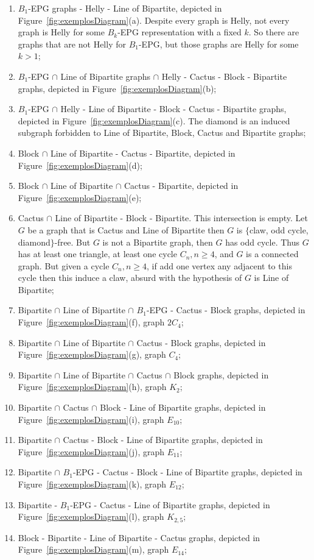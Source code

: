 \documentclass[9pt]{entcs}
\begin{document}
\begin{enumerate}[label=(\arabic*)]
    \item $B_1$-EPG graphs - Helly - Line of Bipartite, depicted in Figure~\ref{fig:exemplosDiagram}(a). Despite every graph is Helly, not every graph is Helly for some $B_k$-EPG representation with a fixed $k$. So there are graphs that are not Helly for $B_1$-EPG, but those graphs are Helly for some $k>1$;%
    
    \item $B_1$-EPG $\cap$ Line of Bipartite graphs $\cap$ Helly - Cactus - Block - Bipartite graphs, depicted in Figure~\ref{fig:exemplosDiagram}(b);%
    \item $B_1$-EPG $\cap$ Helly - Line of Bipartite - Block - Cactus - Bipartite graphs, depicted in Figure~\ref{fig:exemplosDiagram}(c). The diamond is an induced subgraph forbidden to Line of Bipartite, Block, Cactus and Bipartite graphs;%
    \item Block $\cap$ Line of Bipartite - Cactus - Bipartite, depicted in Figure~\ref{fig:exemplosDiagram}(d);%
    \item Block $\cap$ Line of Bipartite $\cap$  Cactus - Bipartite, depicted in Figure~\ref{fig:exemplosDiagram}(e);%
    \item Cactus $\cap$ Line of Bipartite - Block - Bipartite. This intersection is empty. Let $G$ be a graph that is Cactus and Line of Bipartite then $G$ is $\{$claw, odd cycle, diamond$\}$-free. But $G$ is not a Bipartite graph, then $G$ has odd cycle. Thus $G$ has at least one triangle, at least one cycle $C_n, n\geq 4$, and $G$ is a connected graph. But given a cycle $C_n, n\geq 4$, if add one vertex any adjacent to this cycle then this induce a claw, absurd with the hypothesis of $G$ is Line of Bipartite;%
    \item Bipartite $\cap$ Line of Bipartite $\cap$ $B_1$-EPG - Cactus - Block graphs, depicted in Figure~\ref{fig:exemplosDiagram}(f), graph $2C_4$;%
    \item Bipartite $\cap$ Line of Bipartite $\cap$  Cactus - Block graphs, depicted in Figure~\ref{fig:exemplosDiagram}(g), graph $C_4$;%
    \item Bipartite $\cap$ Line of Bipartite $\cap$  Cactus $\cap$ Block graphs, depicted in Figure~\ref{fig:exemplosDiagram}(h), graph $K_2$;%
  \item Bipartite $\cap$  Cactus $\cap$ Block - Line of Bipartite graphs, depicted in Figure~\ref{fig:exemplosDiagram}(i), graph $E_{10}$;%
    \item Bipartite  $\cap$  Cactus - Block -  Line of Bipartite graphs, depicted in Figure~\ref{fig:exemplosDiagram}(j), graph $E_{11}$;%
     \item Bipartite $\cap$ $B_1$-EPG - Cactus - Block -  Line of Bipartite graphs, depicted in Figure~\ref{fig:exemplosDiagram}(k), graph $E_{12}$;%
      \item Bipartite - $B_1$-EPG - Cactus -  Line of Bipartite graphs, depicted in Figure~\ref{fig:exemplosDiagram}(l), graph $K_{2,5}$;%
      \item Block - Bipartite - Line of Bipartite  - Cactus graphs, depicted in Figure~\ref{fig:exemplosDiagram}(m), graph $E_{14}$;%
 

\end{enumerate}
\end{document}

